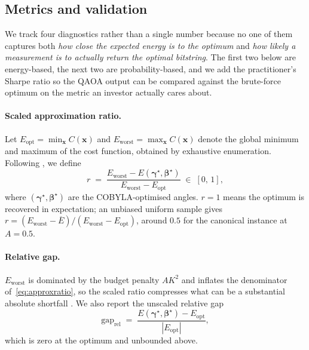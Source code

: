 \subsection{Metrics and validation}\label{subsec:metrics}

We track four diagnostics rather than a single number because no one of them captures both \emph{how close the expected energy is to the optimum} and \emph{how likely a measurement is to actually return the optimal bitstring}. The first two below are energy-based, the next two are probability-based, and we add the practitioner's Sharpe ratio so the QAOA output can be compared against the brute-force optimum on the metric an investor actually cares about.

\paragraph{Scaled approximation ratio.}
Let $E_{\text{opt}} = \min_{\boldsymbol{x}} C(\boldsymbol{x})$ and $E_{\text{worst}} = \max_{\boldsymbol{x}} C(\boldsymbol{x})$ denote the global minimum and maximum of the cost function, obtained by exhaustive enumeration. Following \textcite{farhi2014qaoa}, we define
\begin{equation}\label{eq:approxratio}
    r \;=\; \frac{E_{\text{worst}} - E(\boldsymbol\gamma^\star, \boldsymbol\beta^\star)}{E_{\text{worst}} - E_{\text{opt}}} \;\in\; [0,\,1],
\end{equation}
where $(\boldsymbol\gamma^\star, \boldsymbol\beta^\star)$ are the COBYLA-optimised angles. $r = 1$ means the optimum is recovered in expectation; an unbiased uniform sample gives $r = (E_{\text{worst}} - \overline{E}) / (E_{\text{worst}} - E_{\text{opt}})$, around $0.5$ for the canonical instance at $A=0.5$.

\paragraph{Relative gap.}
$E_{\text{worst}}$ is dominated by the budget penalty $A K^2$ and inflates the denominator of~\eqref{eq:approxratio}, so the scaled ratio compresses what can be a substantial absolute shortfall \autocite{zhou2018qaoa}. We also report the unscaled relative gap
\begin{equation}\label{eq:gaprel}
    \mathrm{gap}_{\text{rel}} \;=\; \frac{E(\boldsymbol\gamma^\star,\boldsymbol\beta^\star) - E_{\text{opt}}}{|E_{\text{opt}}|},
\end{equation}
which is zero at the optimum and unbounded above.

